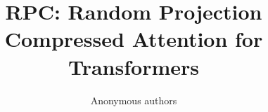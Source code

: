 \title{\textbf{RPC: Random Projection Compressed Attention for Transformers}}

\author{Anonymous authors}

